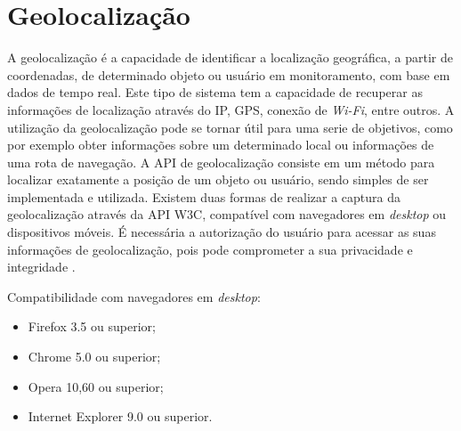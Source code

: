 \section{Geolocalização}


A geolocalização é a capacidade de identificar a localização geográfica, a partir de coordenadas, de determinado objeto ou usuário em monitoramento, com base em dados de tempo real. Este tipo de sistema tem a capacidade de recuperar as informações de localização através do IP, GPS, conexão de \textit{Wi-Fi}, entre outros. A utilização da geolocalização pode se tornar útil para uma serie de objetivos, como por exemplo obter informações sobre um determinado local ou informações de uma rota de navegação. A API de geolocalização consiste em um método para localizar exatamente a posição de um objeto ou usuário, sendo simples de ser implementada e utilizada. Existem duas formas de realizar a captura da geolocalização através da API W3C, compatível com navegadores em \textit{desktop} ou dispositivos móveis. É necessária a autorização do usuário para acessar as suas informações de geolocalização, pois pode comprometer a sua privacidade e integridade \cite{geolocalizacao:2011}.

Compatibilidade com navegadores em \textit{desktop}:
\begin{itemize}
    \item Firefox 3.5 ou superior;
    \item Chrome 5.0 ou superior;
    \item Opera 10,60 ou superior;
    \item Internet Explorer 9.0 ou superior. \\
\end{itemize}


